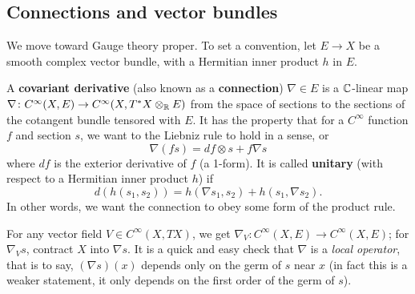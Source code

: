\subsection{Connections and vector bundles}
We move toward Gauge theory proper. To set a convention, let $E \to X$ be a smooth complex vector bundle, with a Hermitian inner product $h $ in $E$.

\begin{definition}[]
    A \textbf{covariant derivative} (also known as a \textbf{connection}) $\nabla \in E$ is a $\mathbb{C}$-linear map $\nabla \colon C^{\infty} (X,E)\to C ^{\infty}(X, T^*X \otimes _{\mathbb{R}}E) $ from the space of sections to the sections of the cotangent bundle tensored with $E$. It has the property that for a $C ^{\infty}$ function $f$ and section $s$, we want to the Liebniz rule to hold in a sense, or \[
        \nabla  (fs) = df \otimes s + f \nabla s
    \] where $df$ is the exterior derivative of $f$ (a 1-form). It is called \textbf{unitary} (with respect to a Hermitian inner product $h$) if \[
    d(h(s_1,s_2)) = h (\nabla s_1,s_2) + h(s_1, \nabla s_2).
    \] In other words, we want the connection to obey some form of the product rule.
\end{definition}

For any vector field $V \in C ^{\infty}(X,TX)$, we get $\nabla_V \colon C ^{\infty}(X,E) \to C ^{\infty}(X,E)$; for $\nabla_V s$, contract $X$ into $\nabla s$. It is a quick and easy check that $\nabla$ is a \emph{local operator}, that is to say, $(\nabla s)(x)$ depends only on the germ of $s$ near $x$ (in fact this is a weaker statement, it only depends on the first order of the germ of $s$). 

